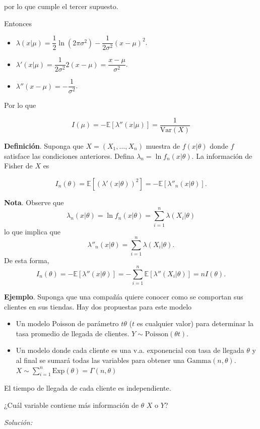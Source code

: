 \documentclass[
  12pt,
]{book}
\begin{document}
por lo que cumple el tercer supuesto.

Entonces

\begin{itemize}
\item
  \(\lambda(x|\mu) = \dfrac 12 \ln (2\pi\sigma^2)-\dfrac 1{2\sigma^2}(x-\mu)^2\).
\item
  \(\lambda'(x|\mu) = \dfrac 1{2\sigma^2}2(x-\mu) = \dfrac{x-\mu}{\sigma^2}\).
\item
  \(\lambda''(x-\mu) = -\dfrac 1{\sigma^2}\).
\end{itemize}

Por lo que

\[I(\mu) = -\mathbb E[\lambda''(x|\mu)] = \dfrac{1}{\text{Var}(X)}\]

\textbf{Definición}. Suponga que \(X = (X_1,\dots,X_n)\) muestra de \(f(x|\theta)\) donde \(f\) satisface las condiciones anteriores. Defina \(\lambda_n = \ln f_n(x|\theta)\). La información de Fisher de \(X\) es

\[I_n(\theta) = \mathbb E[(\lambda'(x|\theta))^2] = - \mathbb E[\lambda''_n(x|\theta)].\]

\textbf{Nota}. Observe que
\[\lambda_n(x|\theta) = \ln f_n(x|\theta) = \sum_{i=1}^{n} \lambda(X_i|\theta)\]
lo que implica que
\[\lambda''_n(x|\theta) = \sum_{i=1}^n\lambda(X_i|\theta).\]
De esta forma,
\[I_n(\theta) = -\mathbb E[\lambda''(x|\theta)] = - \sum_{i=1}^n\mathbb E[\lambda''(X_i|\theta)] = nI(\theta).\]

\textbf{Ejemplo}. Suponga que una compañía quiere conocer como se comportan sus clientes en sus tiendas. Hay dos propuestas para este modelo

\begin{itemize}
\item
  Un modelo Poisson de parámetro \(t\theta\) (\(t\) es cualquier valor) para determinar la tasa promedio de llegada de clientes. \(Y\sim \text{Poisson}(\theta t)\).
\item
  Un modelo donde cada cliente es una v.a. exponencial con tasa de llegada \(\theta\) y al final se sumará todas las variables para obtener una \(\mathrm{Gamma}(n,\theta)\). \(X\sim \sum_{i=1}^{n}\text{Exp}(\theta) = \Gamma(n,\theta)\)
\end{itemize}

El tiempo de llegada de cada cliente es independiente.

¿Cuál variable contiene más información de \(\theta\) \(X\) o \(Y\)?

\emph{Solución:}
\end{document}
